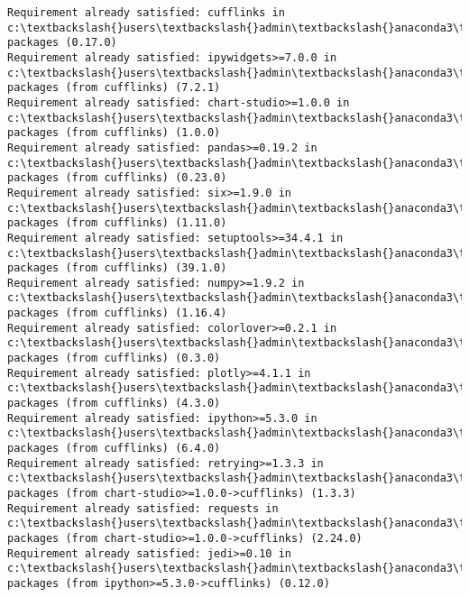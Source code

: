\documentclass[11pt]{article}
\begin{document}
    \begin{Verbatim}[commandchars=\\\{\}]
Requirement already satisfied: cufflinks in c:\textbackslash{}users\textbackslash{}admin\textbackslash{}anaconda3\textbackslash{}lib\textbackslash{}site-packages (0.17.0)
Requirement already satisfied: ipywidgets>=7.0.0 in c:\textbackslash{}users\textbackslash{}admin\textbackslash{}anaconda3\textbackslash{}lib\textbackslash{}site-packages (from cufflinks) (7.2.1)
Requirement already satisfied: chart-studio>=1.0.0 in c:\textbackslash{}users\textbackslash{}admin\textbackslash{}anaconda3\textbackslash{}lib\textbackslash{}site-packages (from cufflinks) (1.0.0)
Requirement already satisfied: pandas>=0.19.2 in c:\textbackslash{}users\textbackslash{}admin\textbackslash{}anaconda3\textbackslash{}lib\textbackslash{}site-packages (from cufflinks) (0.23.0)
Requirement already satisfied: six>=1.9.0 in c:\textbackslash{}users\textbackslash{}admin\textbackslash{}anaconda3\textbackslash{}lib\textbackslash{}site-packages (from cufflinks) (1.11.0)
Requirement already satisfied: setuptools>=34.4.1 in c:\textbackslash{}users\textbackslash{}admin\textbackslash{}anaconda3\textbackslash{}lib\textbackslash{}site-packages (from cufflinks) (39.1.0)
Requirement already satisfied: numpy>=1.9.2 in c:\textbackslash{}users\textbackslash{}admin\textbackslash{}anaconda3\textbackslash{}lib\textbackslash{}site-packages (from cufflinks) (1.16.4)
Requirement already satisfied: colorlover>=0.2.1 in c:\textbackslash{}users\textbackslash{}admin\textbackslash{}anaconda3\textbackslash{}lib\textbackslash{}site-packages (from cufflinks) (0.3.0)
Requirement already satisfied: plotly>=4.1.1 in c:\textbackslash{}users\textbackslash{}admin\textbackslash{}anaconda3\textbackslash{}lib\textbackslash{}site-packages (from cufflinks) (4.3.0)
Requirement already satisfied: ipython>=5.3.0 in c:\textbackslash{}users\textbackslash{}admin\textbackslash{}anaconda3\textbackslash{}lib\textbackslash{}site-packages (from cufflinks) (6.4.0)
Requirement already satisfied: retrying>=1.3.3 in c:\textbackslash{}users\textbackslash{}admin\textbackslash{}anaconda3\textbackslash{}lib\textbackslash{}site-packages (from chart-studio>=1.0.0->cufflinks) (1.3.3)
Requirement already satisfied: requests in c:\textbackslash{}users\textbackslash{}admin\textbackslash{}anaconda3\textbackslash{}lib\textbackslash{}site-packages (from chart-studio>=1.0.0->cufflinks) (2.24.0)
Requirement already satisfied: jedi>=0.10 in c:\textbackslash{}users\textbackslash{}admin\textbackslash{}anaconda3\textbackslash{}lib\textbackslash{}site-packages (from ipython>=5.3.0->cufflinks) (0.12.0)

\end{Verbatim}
\end{document}
